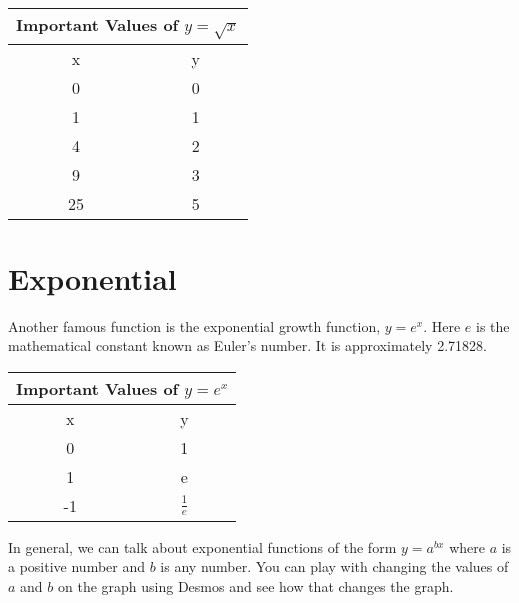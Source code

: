 \documentclass{ximera}
\begin{document}
\begin{tabular}{ |c || c|  }
 \hline
 \multicolumn{2}{|c|}{Important Values of $y=\sqrt{x}$} \\
\hline
 \hline
 x & y\\
 \hline
 0&0\\
 1&1\\
 4&2\\
 9&3\\
 25&5\\
 \hline
\end{tabular}



\section{Exponential}
Another famous function is the exponential growth function, $y=e^x$.  Here $e$ is the mathematical constant known as Euler's number.  It is approximately 2.71828.


\begin{tabular}{ |c || c|  }
 \hline
 \multicolumn{2}{|c|}{Important Values of $y=e^x$} \\
\hline
 \hline
 x & y\\
 \hline
 0&1\\
 1&e\\
 -1&$\frac{1}{e}$\\
 \hline
\end{tabular}

In general, we can talk about exponential functions of the form $y=a^{bx}$ where $a$ is a positive number and $b$ is any number.  You can play with changing the values of $a$ and $b$ on the graph using Desmos and see how that changes the graph.  

\begin{center}  
\end{center}



\end{document}
